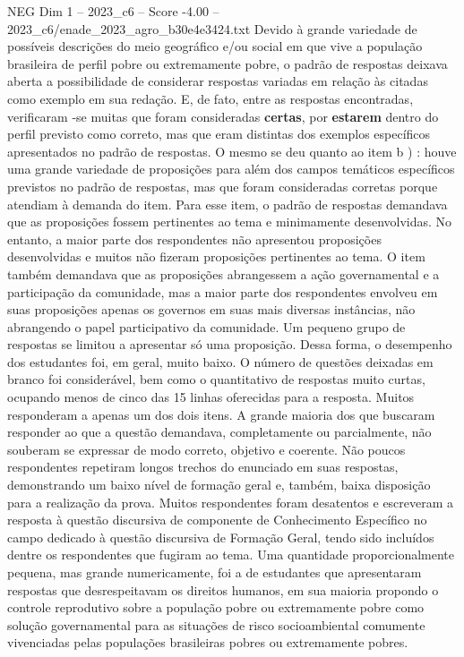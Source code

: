 \begin{textsample}{NEG Dim 1 – 2023\_c6 – Score -4.00 – 2023\_c6/enade\_2023\_agro\_b30e4e3424.txt}
Devido à grande variedade de possíveis descrições do meio geográfico e/ou social em que vive a população brasileira de perfil pobre ou extremamente pobre, o padrão de respostas deixava aberta a possibilidade de considerar respostas variadas em relação às citadas como exemplo em sua redação.
E, de fato, entre as respostas encontradas, verificaram -se muitas que foram consideradas \textbf{certas}, por \textbf{estarem} dentro do perfil previsto como correto, mas que eram distintas dos exemplos específicos apresentados no padrão de respostas.
O mesmo se deu quanto ao item b ) : houve uma grande variedade de proposições para além dos campos temáticos específicos previstos no padrão de respostas, mas que foram consideradas corretas porque atendiam à demanda do item.
Para esse item, o padrão de respostas demandava que as proposições fossem pertinentes ao tema e minimamente desenvolvidas.
No entanto, a maior parte dos respondentes não apresentou proposições desenvolvidas e muitos não fizeram proposições pertinentes ao tema.
O item também demandava que as proposições abrangessem a ação governamental e a participação da comunidade, mas a maior parte dos respondentes envolveu em suas proposições apenas os governos em suas mais diversas instâncias, não abrangendo o papel participativo da comunidade.
Um pequeno grupo de respostas se limitou a apresentar só uma proposição.
Dessa forma, o desempenho dos estudantes foi, em geral, muito baixo.
O número de questões deixadas em branco foi considerável, bem como o quantitativo de respostas muito curtas, ocupando menos de cinco das 15 linhas oferecidas para a resposta.
Muitos responderam a apenas um dos dois itens.
A grande maioria dos que buscaram responder ao que a questão demandava, completamente ou parcialmente, não souberam se expressar de modo correto, objetivo e coerente.
Não poucos respondentes repetiram longos trechos do enunciado em suas respostas, demonstrando um baixo nível de formação geral e, também, baixa disposição para a realização da prova.
Muitos respondentes foram desatentos e escreveram a resposta à questão discursiva de componente de Conhecimento Específico no campo dedicado à questão discursiva de Formação Geral, tendo sido incluídos dentre os respondentes que fugiram ao tema.
Uma quantidade proporcionalmente pequena, mas grande numericamente, foi a de estudantes que apresentaram respostas que desrespeitavam os direitos humanos, em sua maioria propondo o controle reprodutivo sobre a população pobre ou extremamente pobre como solução governamental para as situações de risco socioambiental comumente vivenciadas pelas populações brasileiras pobres ou extremamente pobres.

\end{textsample}
